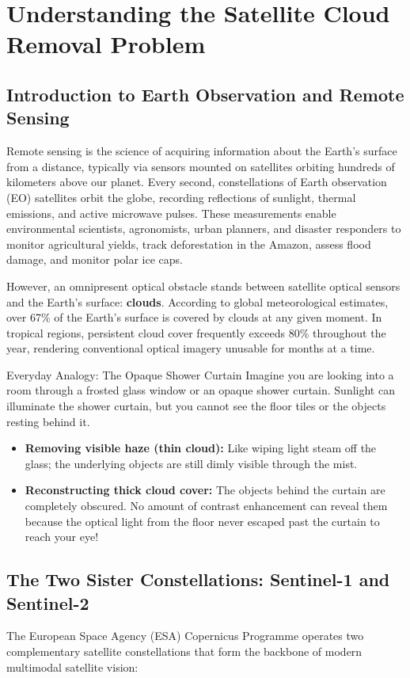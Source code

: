 \chapter{Understanding the Satellite Cloud Removal Problem}
\label{chap:ch01}

\section{Introduction to Earth Observation and Remote Sensing}
Remote sensing is the science of acquiring information about the Earth's surface from a distance, typically via sensors mounted on satellites orbiting hundreds of kilometers above our planet. Every second, constellations of Earth observation (EO) satellites orbit the globe, recording reflections of sunlight, thermal emissions, and active microwave pulses. These measurements enable environmental scientists, agronomists, urban planners, and disaster responders to monitor agricultural yields, track deforestation in the Amazon, assess flood damage, and monitor polar ice caps.

However, an omnipresent optical obstacle stands between satellite optical sensors and the Earth's surface: \textbf{clouds}. According to global meteorological estimates, over 67\% of the Earth's surface is covered by clouds at any given moment. In tropical regions, persistent cloud cover frequently exceeds 80\% throughout the year, rendering conventional optical imagery unusable for months at a time.

\begin{conceptbox}{Everyday Analogy: The Opaque Shower Curtain}
Imagine you are looking into a room through a frosted glass window or an opaque shower curtain. Sunlight can illuminate the shower curtain, but you cannot see the floor tiles or the objects resting behind it. 
\begin{itemize}
    \item \textbf{Removing visible haze (thin cloud):} Like wiping light steam off the glass; the underlying objects are still dimly visible through the mist.
    \item \textbf{Reconstructing thick cloud cover:} The objects behind the curtain are completely obscured. No amount of contrast enhancement can reveal them because the optical light from the floor never escaped past the curtain to reach your eye!
\end{itemize}
\end{conceptbox}

\section{The Two Sister Constellations: Sentinel-1 and Sentinel-2}
The European Space Agency (ESA) Copernicus Programme operates two complementary satellite constellations that form the backbone of modern multimodal satellite vision:

